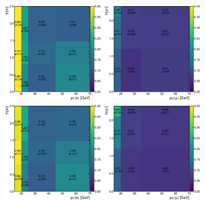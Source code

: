 \begin{figure}
  \centering
  \includegraphics[width=0.45\textwidth]{measurement/2018/fr_data_ewk_Electron.png} \hfill
  \includegraphics[width=0.45\textwidth]{measurement/2018/fr_data_ewk_Muon.png} \\
  \includegraphics[width=0.45\textwidth]{measurement/2018/fr_qcd_Electron.png} \hfill
  \includegraphics[width=0.45\textwidth]{measurement/2018/fr_qcd_Muon.png} \\

\end{figure}
